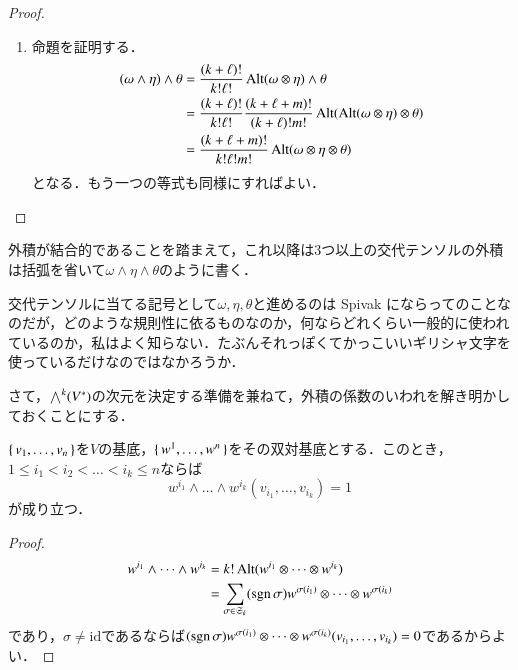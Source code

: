 \begin{proof}
\begin{enumerate}
\begin{enumerate}
\item 命題を証明する．
\begin{align}
(\omega \wedge \eta) \wedge \theta &= \frac{(k+\ell)!}{k!\ell!}\operatorname{Alt}(\omega \otimes \eta) \wedge \theta \\
&= \frac{(k+\ell)!}{k!\ell!} \frac{(k+\ell+m)!}{(k+\ell)!m!} \operatorname{Alt}(\operatorname{Alt}(\omega \otimes \eta) \otimes \theta) \\
&= \frac{(k+\ell+m)!}{k!\ell!m!} \operatorname{Alt}(\omega \otimes \eta \otimes \theta) \\
\end{align}となる．もう一つの等式も同様にすればよい．
\end{enumerate}
\end{enumerate}
\end{proof}

外積が結合的であることを踏まえて，これ以降は3つ以上の交代テンソルの外積は括弧を省いて$\omega \wedge \eta \wedge \theta$のように書く．

\begin{dig}
交代テンソルに当てる記号として$\omega, \eta, \theta$と進めるのは Spivak にならってのことなのだが，どのような規則性に依るものなのか，何ならどれくらい一般的に使われているのか，私はよく知らない．たぶんそれっぽくてかっこいいギリシャ文字を使っているだけなのではなかろうか．
\end{dig}

さて，$\bigwedge^k(V^*)$の次元を決定する準備を兼ねて，外積の係数のいわれを解き明かしておくことにする．

\begin{lem}
$\set{v_1, \dots, v_n}$を$V$の基底，$\set{w^1, \dots, w^n}$をその双対基底とする．このとき，$1 \leq i_1 < i_2 < \dots < i_k \leq n$ならば
\begin{equation}
w^{i_1} \wedge \dots \wedge w^{i_k} (v_{i_1}, \dots, v_{i_k}) = 1
\end{equation}が成り立つ．
\end{lem}

\begin{proof}
\begin{align}
w^{i_1} \wedge \dots \wedge w^{i_k} &= k! \operatorname{Alt}(w^{i_1} \otimes \dots \otimes w^{i_k}) \\
&= \sum_{\sigma \in \mathfrak{S}_k} (\operatorname{sgn} \sigma) w^{\sigma(i_1)} \otimes \dots \otimes w^{\sigma(i_k)}
\end{align}であり，$\sigma \neq \mathrm{id}$であるならば$(\operatorname{sgn} \sigma) w^{\sigma(i_1)} \otimes \dots \otimes w^{\sigma(i_k)} (v_{i_1}, \dots, v_{i_k})=0$であるからよい．
\end{proof}

